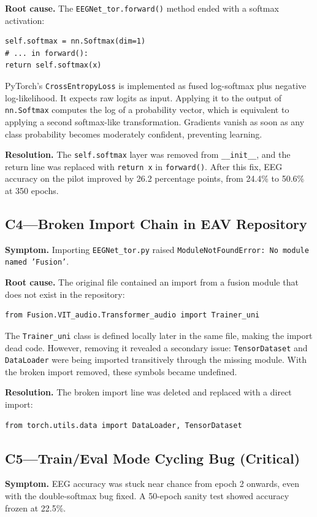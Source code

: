 \textbf{Root cause.} The \texttt{EEGNet\_tor.forward()} method ended with a softmax activation:

\begin{verbatim}
self.softmax = nn.Softmax(dim=1)
# ... in forward():
return self.softmax(x)
\end{verbatim}

PyTorch's \texttt{CrossEntropyLoss} is implemented as fused log-softmax plus negative log-likelihood. It expects raw logits as input. Applying it to the output of \texttt{nn.Softmax} computes the log of a probability vector, which is equivalent to applying a second softmax-like transformation. Gradients vanish as soon as any class probability becomes moderately confident, preventing learning.

\textbf{Resolution.} The \texttt{self.softmax} layer was removed from \texttt{\_\_init\_\_}, and the return line was replaced with \texttt{return x} in \texttt{forward()}. After this fix, EEG accuracy on the pilot improved by 26.2 percentage points, from 24.4\% to 50.6\% at 350 epochs.

\subsection*{C4---Broken Import Chain in EAV Repository}
\textbf{Symptom.} Importing \texttt{EEGNet\_tor.py} raised \texttt{ModuleNotFoundError: No module named 'Fusion'}.

\textbf{Root cause.} The original file contained an import from a fusion module that does not exist in the repository:

\begin{verbatim}
from Fusion.VIT_audio.Transformer_audio import Trainer_uni
\end{verbatim}

The \texttt{Trainer\_uni} class is defined locally later in the same file, making the import dead code. However, removing it revealed a secondary issue: \texttt{TensorDataset} and \texttt{DataLoader} were being imported transitively through the missing module. With the broken import removed, these symbols became undefined.

\textbf{Resolution.} The broken import line was deleted and replaced with a direct import:

\begin{verbatim}
from torch.utils.data import DataLoader, TensorDataset
\end{verbatim}

\subsection*{C5---Train/Eval Mode Cycling Bug (Critical)}
\textbf{Symptom.} EEG accuracy was stuck near chance from epoch 2 onwards, even with the double-softmax bug fixed. A 50-epoch sanity test showed accuracy frozen at 22.5\%.


